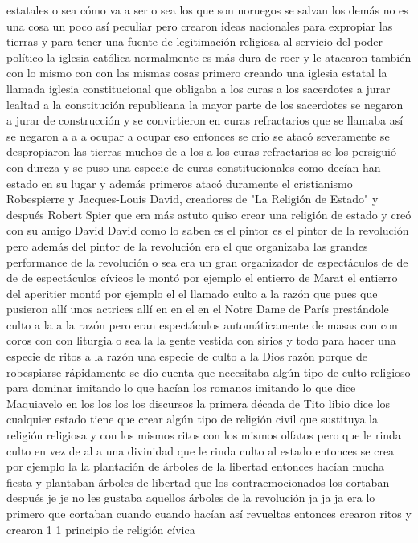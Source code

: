 estatales o sea cómo va a ser o sea los que son noruegos se salvan los demás no
es una cosa un poco así peculiar pero crearon ideas nacionales para expropiar las tierras
y para tener una fuente de legitimación religiosa al servicio del poder político la iglesia católica normalmente es más dura de roer
y le atacaron también con lo mismo con con las mismas cosas primero creando una iglesia estatal
la llamada iglesia constitucional que obligaba a los curas a los sacerdotes a jurar
lealtad a la constitución republicana la mayor parte de los sacerdotes se negaron a jurar de construcción y se convirtieron en curas refractarios
que se llamaba así se negaron a a a ocupar a ocupar eso entonces se crio
se atacó severamente se despropiaron las tierras muchos de a los a los curas refractarios se los persiguió con dureza
y se puso una especie de curas constitucionales como decían han estado en su lugar y además primeros atacó duramente el cristianismo
Robespierre y Jacques-Louis David, creadores de "La Religión de Estado"
y después Robert Spier que era más astuto quiso crear una religión de estado y creó con su amigo David
David como lo saben es el pintor es el pintor de la revolución pero además del pintor de la revolución era el que organizaba las grandes performance
de la revolución o sea era un gran organizador de espectáculos de de de de espectáculos cívicos
le montó por ejemplo el entierro de Marat el entierro del aperitier montó por ejemplo
el el llamado culto a la razón que pues que pusieron allí unos actrices allí en en el en el Notre Dame de París
prestándole culto a la a la razón pero eran espectáculos automáticamente de masas con
con coros con con liturgia o sea la la gente vestida con sirios y todo
para hacer una especie de ritos a la razón una especie de culto a la Dios razón porque de robespiarse
rápidamente se dio cuenta que necesitaba algún tipo de culto religioso para dominar imitando lo que hacían los romanos
imitando lo que dice Maquiavelo en los los los los discursos la primera década de Tito libio
dice los cualquier estado tiene que crear algún tipo de religión civil que sustituya la religión religiosa y con los mismos ritos
con los mismos olfatos pero que le rinda culto en vez de al a una divinidad que le rinda culto al estado
entonces se crea por ejemplo la la plantación de árboles de la libertad entonces hacían mucha fiesta y plantaban árboles de libertad
que los contraemocionados los cortaban después je je no les gustaba aquellos árboles de la revolución ja ja ja era lo primero que cortaban
cuando cuando hacían así revueltas entonces crearon ritos y crearon 1 1 principio de religión cívica
